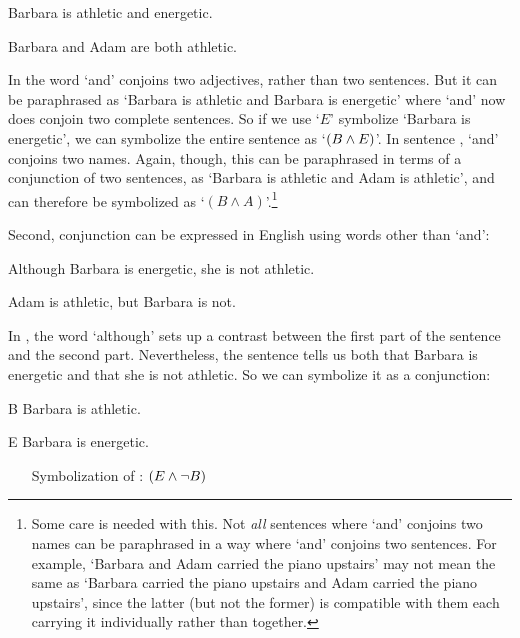 	\begin{earg}
		\item[\ex{and4}]Barbara is athletic and energetic.
		\item[\ex{and5}]Barbara and Adam are both athletic.
	\end{earg}

In  the word `and' conjoins two adjectives, rather than two sentences.  But it can be paraphrased as `Barbara is athletic and Barbara is energetic' where `and' now does conjoin two complete sentences.  So if we use `$E$' symbolize `Barbara is energetic', we can symbolize the entire sentence as `$(B\wedge E)$'.  In sentence , `and' conjoins two names.  Again, though, this can be paraphrased in terms of a conjunction of two sentences, as `Barbara is athletic and Adam is athletic', and can therefore be symbolized as `$(B \land A)$'.\footnote{Some care is needed with this.  Not \emph{all} sentences where `and' conjoins two names can be paraphrased in a way where `and' conjoins two sentences.  For example, `Barbara and Adam carried the piano upstairs' may not mean the same as `Barbara carried the piano upstairs and Adam carried the piano upstairs', since the latter (but not the former) is compatible with them each carrying it individually rather than together. }

Second, conjunction can be expressed in English using words other than `and':

	\begin{earg}
	\item[\ex{and6}]Although Barbara is energetic, she is not athletic.
	\item[\ex{and7}]Adam is athletic, but Barbara is not.
	\end{earg}

In , the word `although' sets up a contrast between the first part of the sentence and the second part. Nevertheless, the sentence tells us both that Barbara is energetic and that she is not athletic.  So we can symbolize it as a conjunction:

\begin{ekey}
		\item[B] Barbara is athletic.
		\item[E] Barbara is energetic.
\end{ekey}

\begin{itemize}
\item[] Symbolization of : $(E \wedge \neg B)$
\end{itemize}
	
